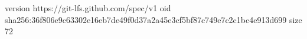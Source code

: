 version https://git-lfs.github.com/spec/v1
oid sha256:36f806e9c63302e16eb7de49f0d37a2a45e3cf5bf87c749e7c2c1bc4e913d699
size 72
